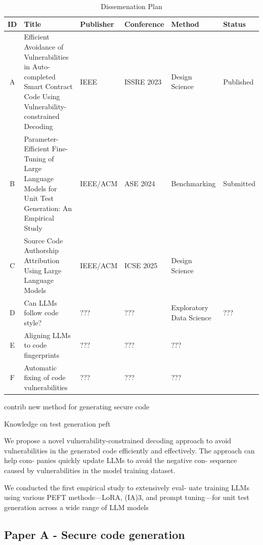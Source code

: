 \documentclass{article}
\begin{document}
\begin{table}[htp]
    \centering
    \small
    \caption{Dissemenation Plan}
    \label{tab:my_label}
    
    \begin{tabularx}{\textwidth}{cp{5cm}XlXX}
        \toprule
        \textbf{ID} & \textbf{Title} & \textbf{Publisher} & \textbf{Conference} & \textbf{Method} & \textbf{Status} \\
        \midrule
        A & Efficient Avoidance of Vulnerabilities in Auto-completed Smart Contract Code Using Vulnerability-constrained Decoding & IEEE & ISSRE 2023 \cite{issre} & Design Science \cite{ralph2021empirical} & Published \\
        B & Parameter-Efficient Fine-Tuning of Large Language Models for
Unit Test Generation: An Empirical Study & IEEE/ACM & ASE 2024 \cite{ase} & Benchmarking \cite{ralph2021empirical} & Submitted \\
        C & Source Code Authorship Attribution Using Large Language Models & IEEE/ACM & ICSE 2025 \cite{icse} & Design Science \cite{ralph2021empirical} &  \\
        D & Can LLMs follow code style? & ??? & ??? \cite{icse} &   Exploratory Data Science \cite{ralph2021empirical}& ??? \\
        E & Aligning LLMs to code fingerprints & ??? & ??? & ???\\
        F & Automatic fixing of code vulnerabilities & ??? & ??? & ???\\
        \bottomrule
    \end{tabularx}
\end{table}

contrib
new method for generating secure code

Knowledge on test generation peft


We propose a novel vulnerability-constrained decoding approach to avoid vulnerabilities in the generated code efficiently and effectively. The approach can help com- panies quickly update LLMs to avoid the negative con- sequence caused by vulnerabilities in the model training dataset.

We conducted the first empirical study to extensively eval-
uate training LLMs using various PEFT methods—LoRA,
(IA)3, and prompt tuning—for unit test generation across a
wide range of LLM models

\subsection{Paper A - Secure code generation}
\end{document}

